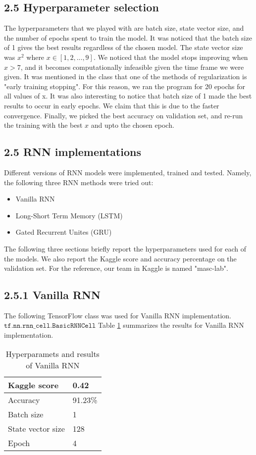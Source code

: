 \subsection*{2.5 Hyperparameter selection}
The hyperparameters that we played with are batch size, state vector size, and the number of epochs spent to train the model. It was noticed that the batch size of 1 gives the best results regardless of the chosen model. The state vector size was \(x^{2}\) where \(x \in [1,2,...,9]\). We noticed that the model stops improving when \(x>7\), and it becomes computationally infeasible given the time frame we were given. It was mentioned in the class that one of the methods of regularization is "early training stopping". For this reason, we ran the program for 20 epochs for all values of x. It was also interesting to notice that batch size of 1 made the best results to occur in early epochs. We claim that this is due to the faster convergence. Finally, we picked the best accuracy on validation set, and re-run the training with the best \(x\) and upto the chosen epoch. 

\subsection*{2.5 RNN implementations}
Different versions of RNN models were implemented, trained and tested. Namely, the following three RNN methods were tried out:
\begin{itemize}
	\item Vanilla RNN
	\item Long-Short Term Memory (LSTM)
	\item Gated Recurrent Unites (GRU)
\end{itemize}

The following three sections briefly report the hyperparameters used for each of the models. We also report the Kaggle score and accuracy percentage on the validation set. For the reference, our team in Kaggle is named "masc-lab".
	
\subsection*{2.5.1 Vanilla RNN}
The following TensorFlow class was used for Vanilla RNN implementation. 
\(\texttt{tf.nn.rnn_cell.BasicRNNCell}\)
Table \ref{vanilla-table} summarizes the results for Vanilla RNN implementation.
\begin{table}[h]
\centering
\begin{tabular}{|l|l|}
\hline
 Kaggle score & 0.42 \\ \hline
 Accuracy & 91.23\% \\ \hline
 Batch size & 1 \\ \hline
 State vector size & 128 \\ \hline
 Epoch & 4 \\ \hline
\end{tabular}
\caption{Hyperparamets and results of Vanilla RNN}
\label{vanilla-table}
\end{table}

